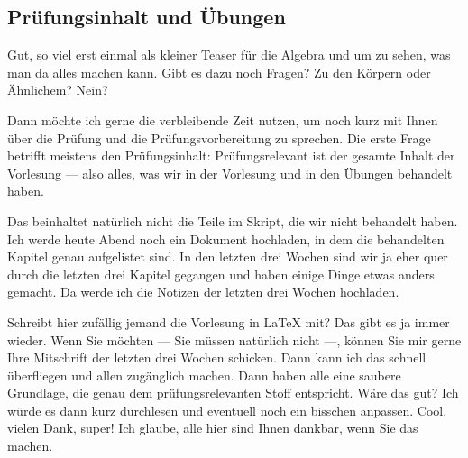 \subsection{Prüfungsinhalt und Übungen}

\begin{spoken-clean}[01:12:58 - 01:16:29]
Gut, so viel erst einmal als kleiner Teaser für die Algebra und um zu sehen, was man da alles machen kann. Gibt es dazu noch Fragen? Zu den Körpern oder Ähnlichem? Nein?

Dann möchte ich gerne die verbleibende Zeit nutzen, um noch kurz mit Ihnen über die Prüfung und die Prüfungsvorbereitung zu sprechen. Die erste Frage betrifft meistens den Prüfungsinhalt: Prüfungsrelevant ist der gesamte Inhalt der Vorlesung --- also alles, was wir in der Vorlesung und in den Übungen behandelt haben.
\end{spoken-clean}

\begin{spoken-clean}[01:16:29 - 01:18:37]
Das beinhaltet natürlich nicht die Teile im Skript, die wir nicht behandelt haben. Ich werde heute Abend noch ein Dokument hochladen, in dem die behandelten Kapitel genau aufgelistet sind. In den letzten drei Wochen sind wir ja eher quer durch die letzten drei Kapitel gegangen und haben einige Dinge etwas anders gemacht. Da werde ich die Notizen der letzten drei Wochen hochladen.

Schreibt hier zufällig jemand die Vorlesung in LaTeX mit? Das gibt es ja immer wieder. Wenn Sie möchten --- Sie müssen natürlich nicht ---, können Sie mir gerne Ihre Mitschrift der letzten drei Wochen schicken. Dann kann ich das schnell überfliegen und allen zugänglich machen. Dann haben alle eine saubere Grundlage, die genau dem prüfungsrelevanten Stoff entspricht. Wäre das gut? Ich würde es dann kurz durchlesen und eventuell noch ein bisschen anpassen. Cool, vielen Dank, super! Ich glaube, alle hier sind Ihnen dankbar, wenn Sie das machen.
\end{spoken-clean}

